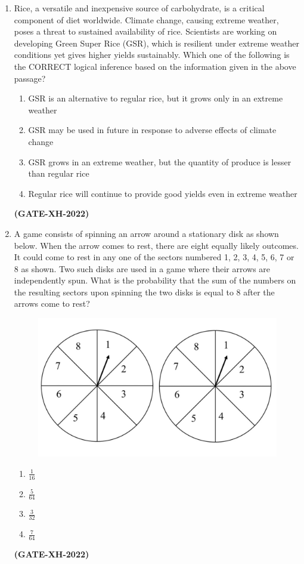 \documentclass[journal]{IEEEtran}
\begin{document}
\begin{enumerate}
\item Rice, a versatile and inexpensive source of carbohydrate, is a critical component of diet worldwide. Climate change, causing extreme weather, poses a threat to sustained availability of rice. Scientists are working on developing Green Super Rice (GSR), which is resilient under extreme weather conditions yet gives higher yields sustainably. Which one of the following is the CORRECT logical inference based on the information given in the above passage?
\begin{enumerate}
\item GSR is an alternative to regular rice, but it grows only in an extreme weather
\item GSR may be used in future in response to adverse effects of climate change
\item GSR grows in an extreme weather, but the quantity of produce is lesser than regular rice
\item Regular rice will continue to provide good yields even in extreme weather
\end{enumerate}
\hfill\textbf{(GATE-XH-2022)}

\item A game consists of spinning an arrow around a stationary disk as shown below. When the arrow comes to rest, there are eight equally likely outcomes. It could come to rest in any one of the sectors numbered 1, 2, 3, 4, 5, 6, 7 or 8 as shown. Two such disks are used in a game where their arrows are independently spun. What is the probability that the sum of the numbers on the resulting sectors upon spinning the two disks is equal to 8 after the arrows come to rest?
\begin{figure}[h!]
\centering
\includegraphics[width=0.5\columnwidth]{figs/Q7.jpg}
\caption*{}
\label{fig:placeholder}
\end{figure}
\begin{multicols}{4}
\begin{enumerate}
\item $\frac{1}{16}$
\item $\frac{5}{64}$
\item $\frac{3}{32}$
\item $\frac{7}{64}$
\end{enumerate}
\end{multicols}
\hfill\textbf{(GATE-XH-2022)}


\end{enumerate}
\end{document}
